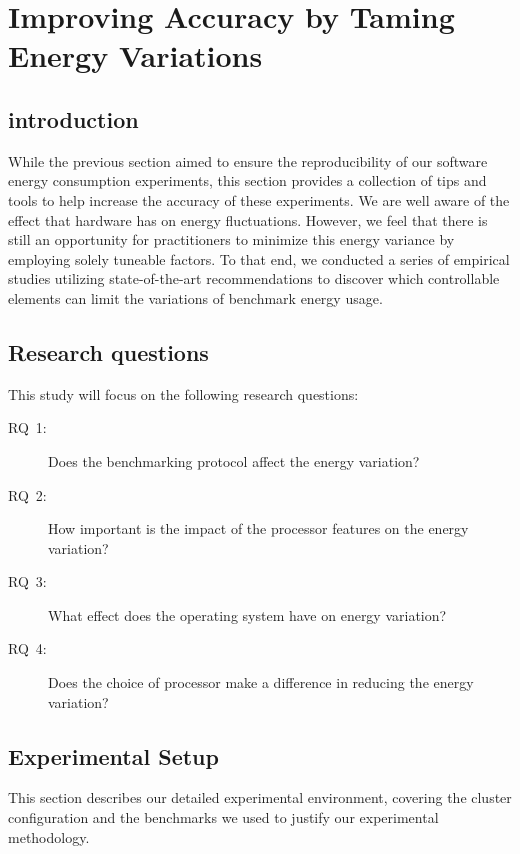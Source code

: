
\section{Improving Accuracy by Taming Energy Variations}\label{sec:taming-the-energy-variation}
\subsection{introduction}
While the previous section aimed to ensure the reproducibility of our software energy consumption experiments, this section provides a collection of tips and tools to help increase the accuracy of these experiments.
We are well aware of the effect that hardware has on energy fluctuations.
However, we feel that there is still an opportunity for practitioners to minimize this energy variance by employing solely tuneable factors.
To that end, we conducted a series of empirical studies utilizing state-of-the-art recommendations to discover which controllable elements can limit the variations of benchmark energy usage.
\subsection{Research questions}
This study will focus on the following research questions:
\begin{description}
    \item[\textsc{RQ}~1:] Does the benchmarking protocol affect the energy variation?
    \item[\textsc{RQ}~2:] How important is the impact of the processor features on the energy variation?
    \item[\textsc{RQ}~3:] What effect does the operating system have on energy variation?
    \item[\textsc{RQ}~4:] Does the choice of processor make a difference in reducing the energy variation?
\end{description}


\subsection{Experimental Setup}\label{subsec:setup}
This section describes our detailed experimental environment, covering the cluster configuration and the benchmarks we used to justify our experimental methodology.

